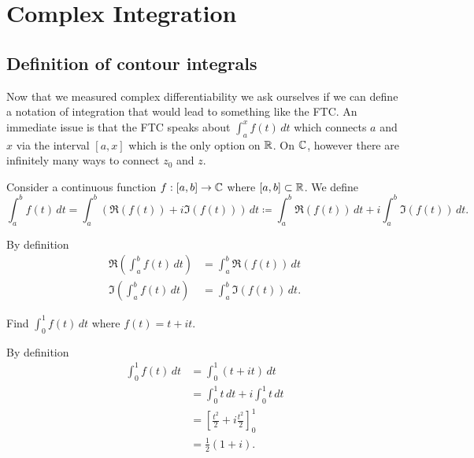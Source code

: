 \documentclass[10pt, a4paper]{article}
\begin{document}
\newpage

\section{Complex Integration}

\subsection{Definition of contour integrals}
Now that we measured complex differentiability we ask ourselves if we can define a notation of integration that would lead to something like the FTC.
An immediate issue is that the FTC speaks about $\int_{a}^{x}f(t)\,dt$ which connects $a$ and $x$ via the interval $[a, x]$ which is the only option on $\mathbb{R}$.
On $\mathbb{C}$,
however there are infinitely many ways to connect $z_0$ and $z$.

\begin{definition}
    Consider a continuous function $f : [a, b] \to \mathbb{C}$ where $[a, b] \subset \mathbb{R}$.
    We define
    \[
    \int_{a}^{b}f(t)\,dt = \int_{a}^{b}(\Re(f(t)) + i\Im(f(t)))\,dt \coloneqq \int_{a}^{b}\Re(f(t))\,dt + i\int_{a}^{b}\Im(f(t))\,dt.
    \]
\end{definition}
By definition
\begin{align*}
    \Re\left(\int_{a}^{b}f(t)\,dt\right) &= \int_{a}^{b}\Re(f(t))\,dt \\
    \Im\left(\int_{a}^{b}f(t)\,dt\right) &= \int_{a}^{b}\Im(f(t))\,dt.
\end{align*}

\begin{example}
    Find $\int_{0}^{1}f(t)\,dt$ where $f(t) = t + it$.

    \begin{solution}
        By definition
        \begin{align*}
            \int_{0}^{1}f(t)\,dt &= \int_{0}^{1}(t + it)\,dt \\
            &= \int_{0}^{1}t\,dt + i\int_{0}^{1}t\,dt \\
            &= \left[\frac{t ^ 2}{2} + i\frac{t ^ 2}{2}\right]_{0}^{1} \\
            &= \frac{1}{2}(1 + i).
        \end{align*}
    \end{solution}
\end{example}
\end{document}
